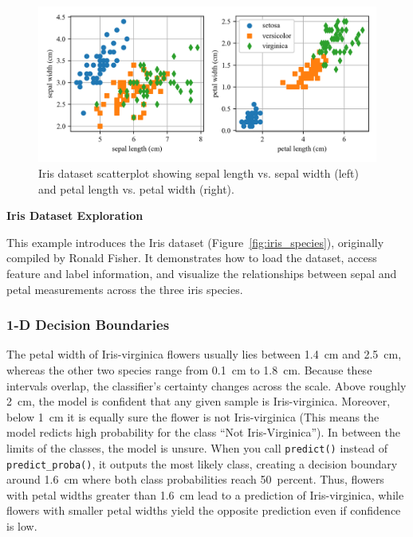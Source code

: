 \documentclass[12pt,letter]{article}
\begin{document}
\begin{data}
		\begin{figure}[H]
			\centering
			\includegraphics[width=5.5in]{../figures/Iris_dataset_scatterplot.png}
			\caption{Iris dataset scatterplot showing sepal length vs. sepal width (left) and petal length vs. petal width (right).  }
			\label{Iris_dataset_scatterplot}
		\end{figure}

\end{data}



\begin{example}
\textbf{Iris Dataset Exploration}

\noindent This example introduces the Iris dataset (Figure~\ref{fig:iris_species}), originally compiled by Ronald Fisher. It demonstrates how to load the dataset, access feature and label information, and visualize the relationships between sepal and petal measurements across the three iris species.
\end{example}

\subsubsection{1-D Decision Boundaries}

The petal width of Iris-virginica flowers usually lies between 1.4~cm and 2.5~cm, whereas the other two species range from 0.1~cm to 1.8~cm. Because these intervals overlap, the classifier's certainty changes across the scale. Above roughly 2~cm, the model is confident that any given sample is Iris-virginica. Moreover, below 1~cm it is equally sure the flower is not Iris-virginica (This means the model redicts high probability for the class ``Not Iris-Virginica''). In between the limits of the classes, the model is unsure. When you call \texttt{predict()} instead of \texttt{predict\_proba()}, it outputs the most likely class, creating a decision boundary around 1.6~cm where both class probabilities reach 50~percent. Thus, flowers with petal widths greater than 1.6~cm lead to a prediction of Iris-virginica, while flowers with smaller petal widths yield the opposite prediction even if confidence is low.
\end{document}
